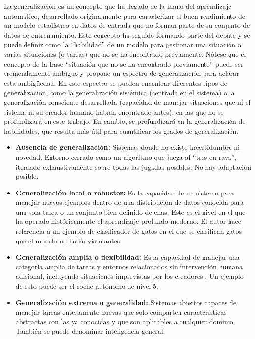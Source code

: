 \documentclass[11pt,a4paper,spanish]{book}
\numberwithin{equation}{chapter}
\numberwithin{figure}{chapter}
\begin{document}
La generalización es un concepto que ha llegado de la mano del aprendizaje automático, desarrollado originalmente para caracterizar el buen rendimiento de un modelo estadístico en 
datos de entrada que no forman parte de su conjunto de datos de entrenamiento. Este concepto ha seguido formando parte del debate y se puede definir como la ``habilidad'' de
un modelo para gestionar una situación o varias situaciones (o tareas) que no se ha encontrado previamente. Nótese que el concepto de la frase ``situación que no se ha encontrado previamente''
puede ser tremendamente ambiguo y  propone un espectro de generalización para aclarar esta ambigüedad. En este espectro se pueden encontrar diferentes tipos de generalización, 
como la generalización sistémica (centrada en el sistema) o la generalización consciente-desarrollada (capacidad de manejar situaciones que ni el sistema ni su creador humano habían encontrado antes), en las que no se 
profundizará en este trabajo. En cambio, se profundizará en la generalización de habilidades, que resulta más útil para cuantificar los grados de generalización.

\begin{itemize}
\item \textbf{Ausencia de generalización:} Sistemas donde no existe incertidumbre ni novedad. Entorno cerrado como un algoritmo que juega al ``tres en raya'',  iterando exhaustivamente sobre todas las jugadas posibles. No hay adaptación posible.
\item \textbf{Generalización local o robustez:} Es la capacidad de un sistema para manejar nuevos ejemplos dentro de una distribución de datos conocida para una sola tarea o un conjunto bien definido de ellas.  Este es el nivel en el que ha operado históricamente el 
aprendizaje profundo moderno. El autor \cite{chollet2019measure} hace referencia a un ejemplo de clasificador de gatos en el que se clasifican gatos que el modelo no había visto antes.
\item \textbf{Generalización amplia o flexibilidad:} Es la capacidad de manejar una categoría amplia de tareas y entornos relacionados sin intervención humana adicional, incluyendo situaciones imprevistas por los creadores \cite{chollet2019measure}. Un ejemplo de esto puede ser el coche autónomo de nivel 5.
\item \textbf{Generalización extrema o generalidad:} Sistemas abiertos capaces de manejar tareas enteramente nuevas que solo comparten características abstractas con las ya conocidas y que son aplicables a cualquier dominio. También se puede denominar inteligencia general.
\end{itemize}
\end{document}

